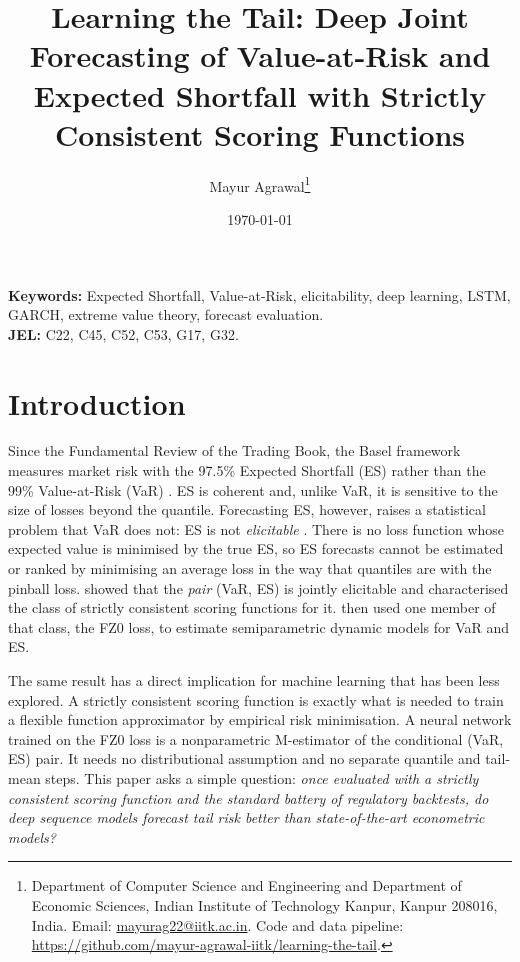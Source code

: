 \documentclass[11pt]{article}
\title{Learning the Tail: Deep Joint Forecasting of Value-at-Risk and Expected Shortfall with Strictly Consistent Scoring Functions}
\author{Mayur Agrawal\thanks{Department of Computer Science and Engineering and Department of Economic Sciences, Indian Institute of Technology Kanpur, Kanpur 208016, India. Email: \href{mailto:mayurag22@iitk.ac.in}{mayurag22@iitk.ac.in}. Code and data pipeline: \url{https://github.com/mayur-agrawal-iitk/learning-the-tail}.}}
\date{\today}
\theoremstyle{remark}
\newcommand{\1}{\mathbf{1}}
\begin{document}
\maketitle

\begin{abstract}

\end{abstract}

\noindent\textbf{Keywords:} Expected Shortfall, Value-at-Risk, elicitability, deep learning, LSTM, GARCH, extreme value theory, forecast evaluation.\\
\noindent\textbf{JEL:} C22, C45, C52, C53, G17, G32.

\section{Introduction}\label{sec:intro}

Since the Fundamental Review of the Trading Book, the Basel framework measures market risk with the 97.5\% Expected Shortfall (ES) rather than the 99\% Value-at-Risk (VaR) \citep{bcbs2019frtb}. ES is coherent \citep{artzner1999coherent} and, unlike VaR, it is sensitive to the size of losses beyond the quantile. Forecasting ES, however, raises a statistical problem that VaR does not: ES is not \emph{elicitable} \citep{gneiting2011making}. There is no loss function whose expected value is minimised by the true ES, so ES forecasts cannot be estimated or ranked by minimising an average loss in the way that quantiles are with the pinball loss. \citet{fissler2016higher} showed that the \emph{pair} (VaR, ES) is jointly elicitable and characterised the class of strictly consistent scoring functions for it. \citet{patton2019dynamic} then used one member of that class, the FZ0 loss, to estimate semiparametric dynamic models for VaR and ES.

The same result has a direct implication for machine learning that has been less explored. A strictly consistent scoring function is exactly what is needed to train a flexible function approximator by empirical risk minimisation. A neural network trained on the FZ0 loss is a nonparametric M-estimator of the conditional (VaR, ES) pair. It needs no distributional assumption and no separate quantile and tail-mean steps. This paper asks a simple question: \emph{once evaluated with a strictly consistent scoring function and the standard battery of regulatory backtests, do deep sequence models forecast tail risk better than state-of-the-art econometric models?}
\end{document}

